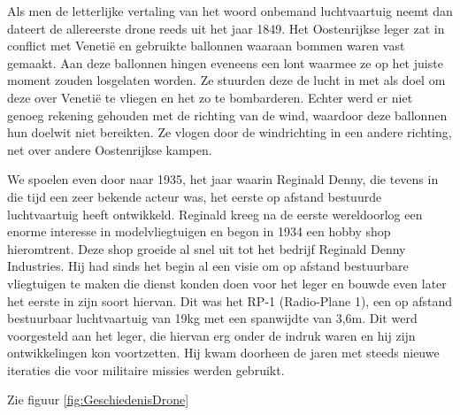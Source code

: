 Als men de letterlijke vertaling van het woord onbemand luchtvaartuig neemt dan dateert de allereerste drone reeds uit het jaar 1849. Het Oostenrijkse leger zat in conflict met Venetië en gebruikte ballonnen waaraan bommen waren vast gemaakt. Aan deze ballonnen hingen eveneens een lont waarmee ze op het juiste moment zouden losgelaten worden. Ze stuurden deze de lucht in met als doel om deze over Venetië te vliegen en het zo te bombarderen. Echter werd er niet genoeg rekening gehouden met de richting van de wind, waardoor deze ballonnen hun doelwit niet bereikten. Ze vlogen door de windrichting in een andere richting, net over andere Oostenrijkse kampen. \autocite{Pumphrey}

We spoelen even door naar 1935, het jaar waarin Reginald Denny, die tevens in die tijd een zeer bekende acteur was, het eerste op afstand bestuurde luchtvaartuig heeft ontwikkeld. Reginald kreeg na de eerste wereldoorlog een enorme interesse in modelvliegtuigen en begon in 1934 een hobby shop hieromtrent. Deze shop groeide al snel uit tot het bedrijf Reginald Denny Industries. Hij had sinds het begin al een visie om op afstand bestuurbare vliegtuigen te maken die dienst konden doen voor het leger en bouwde even later het eerste in zijn soort hiervan. Dit was het RP-1 (Radio-Plane 1), een op afstand bestuurbaar luchtvaartuig van 19kg met een spanwijdte van 3,6m. Dit werd voorgesteld aan het leger, die hiervan erg onder de indruk waren en hij zijn ontwikkelingen kon voortzetten. Hij kwam doorheen de jaren met steeds nieuwe iteraties die voor militaire missies werden gebruikt. \autocite{Guttman2016}

Zie figuur \ref{fig:GeschiedenisDrone}

